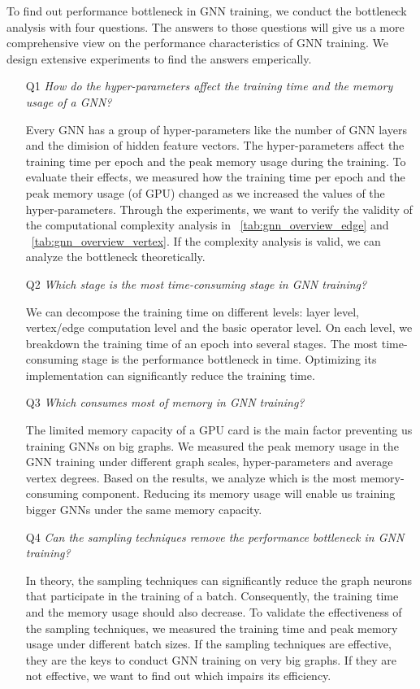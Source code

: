 To find out performance bottleneck in GNN training, we conduct the bottleneck analysis with four questions.
The answers to those questions will give us a more comprehensive view on the performance characteristics of GNN training.
We design extensive experiments to find the answers emperically.
\begin{itemize}
	
	\item[Q1] \emph{How do the hyper-parameters affect the training time and the memory usage of a GNN?}
	
			Every GNN has a group of hyper-parameters like the number of GNN layers and the dimision of hidden feature vectors. The hyper-parameters affect the training time per epoch and the peak memory usage during the training.
			To evaluate their effects, we measured how the training time per epoch and the peak memory usage (of GPU) changed as we increased the values of the hyper-parameters.
			Through the experiments, we want to verify the validity of the computational complexity analysis in \tablename~\ref{tab:gnn_overview_edge} and \tablename~\ref{tab:gnn_overview_vertex}.
			If the complexity analysis is valid, we can analyze the bottleneck theoretically.

	\item[Q2] \emph{Which stage is the most time-consuming stage in GNN training?}
	
			We can decompose the training time on different levels: layer level, vertex/edge computation level and the basic operator level.
			On each level, we breakdown the training time of an epoch into several stages. The most time-consuming stage is the performance bottleneck in time.
			Optimizing its implementation can significantly reduce the training time.
			
	\item[Q3] \emph{Which consumes most of memory in GNN training?}
	
			The limited memory capacity of a GPU card is the main factor preventing us training GNNs on big graphs.
			We measured the peak memory usage in the GNN training under different graph scales, hyper-parameters and average vertex degrees.
			Based on the results, we analyze which is the most memory-consuming component.
			Reducing its memory usage will enable us training bigger GNNs under the same memory capacity.
		
	\item[Q4] \emph{Can the sampling techniques remove the performance bottleneck in GNN training?}
	
			In theory, the sampling techniques can significantly reduce the graph neurons that participate in the training of a batch.
			Consequently, the training time and the memory usage should also decrease.
			To validate the effectiveness of the sampling techniques, we measured the training time and peak memory usage under different batch sizes.
			If the sampling techniques are effective, they are the keys to conduct GNN training on very big graphs.
			If they are not effective, we want to find out which impairs its efficiency.
\end{itemize}

